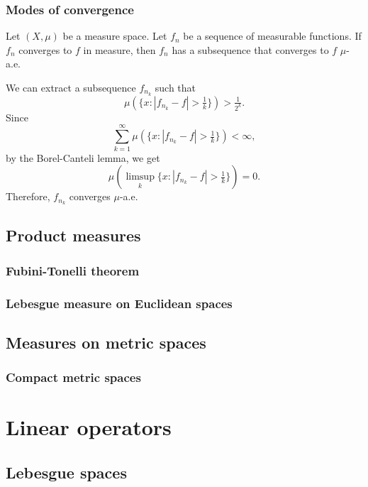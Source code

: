 \documentclass{../note}
\begin{document}
\section{Modes of convergence}

\begin{prb}
Let $(X,\mu)$ be a measure space.
Let $f_n$ be a sequence of measurable functions.
If $f_n$ converges to $f$ in measure, then $f_n$ has a subsequence that converges to $f$ $\mu$-a.e.
\end{prb}
\begin{pf}
We can extract a subsequence $f_{n_k}$ such that
\[\mu(\{x:|f_{n_k}-f|>\tfrac1k\})>\tfrac1{2^k}.\]
Since
\[\sum_{k=1}^\infty\mu(\{x:|f_{n_k}-f|>\tfrac1k\})<\infty,\]
by the Borel-Canteli lemma, we get
\[\mu(\limsup_k\{x:|f_{n_k}-f|>\tfrac1k\})=0.\]
Therefore, $f_{n_k}$ converges $\mu$-a.e.
\end{pf}


\chapter{Product measures}
\section{Fubini-Tonelli theorem}
\section{Lebesgue measure on Euclidean spaces}


\chapter{Measures on metric spaces}


\section{Compact metric spaces}









\part{Linear operators}



\chapter{Lebesgue spaces}
\end{document}
